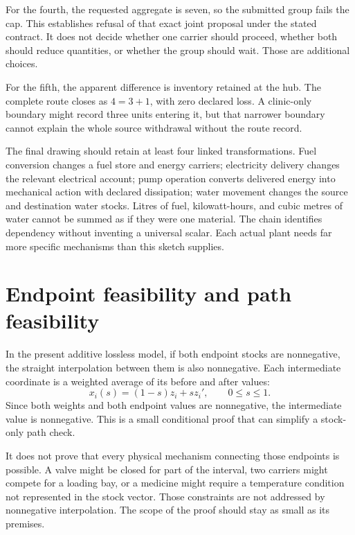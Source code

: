 For the fourth, the requested aggregate is seven, so the submitted group fails the cap. This establishes refusal of that exact joint proposal under the stated contract. It does not decide whether one carrier should proceed, whether both should reduce quantities, or whether the group should wait. Those are additional choices.

For the fifth, the apparent difference is inventory retained at the hub. The complete route closes as \(4=3+1\), with zero declared loss. A clinic-only boundary might record three units entering it, but that narrower boundary cannot explain the whole source withdrawal without the route record.

The final drawing should retain at least four linked transformations. Fuel conversion changes a fuel store and energy carriers; electricity delivery changes the relevant electrical account; pump operation converts delivered energy into mechanical action with declared dissipation; water movement changes the source and destination water stocks. Litres of fuel, kilowatt-hours, and cubic metres of water cannot be summed as if they were one material. The chain identifies dependency without inventing a universal scalar. Each actual plant needs far more specific mechanisms than this sketch supplies.

\section{Endpoint feasibility and path feasibility}

In the present additive lossless model, if both endpoint stocks are nonnegative, the straight interpolation between them is also nonnegative. Each intermediate coordinate is a weighted average of its before and after values:
\begin{equation}
x_i(s)=(1-s)z_i+s z_i',\qquad 0\le s\le1.
\end{equation}
Since both weights and both endpoint values are nonnegative, the intermediate value is nonnegative. This is a small conditional proof that can simplify a stock-only path check.

It does not prove that every physical mechanism connecting those endpoints is possible. A valve might be closed for part of the interval, two carriers might compete for a loading bay, or a medicine might require a temperature condition not represented in the stock vector. Those constraints are not addressed by nonnegative interpolation. The scope of the proof should stay as small as its premises.

